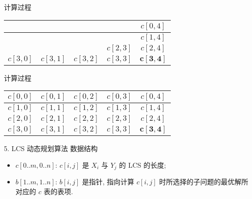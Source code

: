 \documentclass[fontset=fandol,UTF8,fleqn]{beamer}
\begin{document}
\begin{frame}{计算过程}
\begin{table}
\Large{
  \centering
  \begin{tabular}{c|c|c|c|c}
& & & & $c[0,4]$ \\
\hline
& & & & $c[1,4]$   \\
\hline
 & & &  $c[2,3]$ &     $c[2,4]$ \\ 
\hline
    $c[3,0]$ &     $c[3,1]$ &     $c[3,2]$ &     $c[3,3]$ &     $\mathbf{c[3,4]}$  \\ 

  \end{tabular}
}
\end{table}
\end{frame}

\begin{frame}{计算过程}
\begin{table}
\Large{
  \centering
  \begin{tabular}{c|c|c|c|c}
    $c[0,0]$ &     $c[0,1]$ &     $c[0,2]$ &     $c[0,3]$ &     $c[0,4]$  \\ 
\hline
    $c[1,0]$ &     $c[1,1]$ &     $c[1,2]$ &     $c[1,3]$ &     $c[1,4]$  \\ 
\hline
    $c[2,0]$ &     $c[2,1]$ &     $c[2,2]$ &     $c[2,3]$ &     $c[2,4]$  \\ 
\hline
    $c[3,0]$ &     $c[3,1]$ &  $c[3,2]$    &    $c[3,3]$ & $\mathbf{c[3,4]}$  \\ 

  \end{tabular}
}
\end{table}
\end{frame}

\begin{frame}{5. LCS 动态规划算法}
数据结构

  \begin{itemize}[<+-|alert@+>]
\item $c[0..m, 0..n]$: $c[i,j]$ 是 $X_i$ 与 $Y_j$ 的 LCS 的长度; 

\item $b[1..m,1..n]$: $b[i,j]$ 是指针, 指向计算 $c[i,j]$ 时所选择的子问题的最优解所对应的 $c$ 表的表项.  
\end{itemize}
\end{frame}
\end{document}
